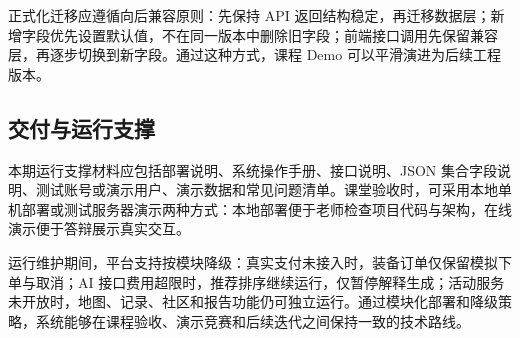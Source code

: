 正式化迁移应遵循向后兼容原则：先保持 API 返回结构稳定，再迁移数据层；新增字段优先设置默认值，不在同一版本中删除旧字段；前端接口调用先保留兼容层，再逐步切换到新字段。通过这种方式，课程 Demo 可以平滑演进为后续工程版本。

\subsection{交付与运行支撑}

本期运行支撑材料应包括部署说明、系统操作手册、接口说明、JSON 集合字段说明、测试账号或演示用户、演示数据和常见问题清单。课堂验收时，可采用本地单机部署或测试服务器演示两种方式：本地部署便于老师检查项目代码与架构，在线演示便于答辩展示真实交互。

运行维护期间，平台支持按模块降级：真实支付未接入时，装备订单仅保留模拟下单与取消；AI 接口费用超限时，推荐排序继续运行，仅暂停解释生成；活动服务未开放时，地图、记录、社区和报告功能仍可独立运行。通过模块化部署和降级策略，系统能够在课程验收、演示竞赛和后续迭代之间保持一致的技术路线。
